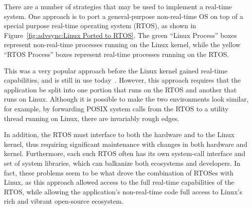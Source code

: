 There are a number of strategies that may be used to implement a
real-time system.
One approach is to port a general-purpose non-real-time OS on top
of a special purpose real-time operating system (RTOS), as shown in
Figure~\ref{fig:advsync:Linux Ported to RTOS}.
The green ``Linux Process'' boxes represent non-real-time processes
running on the Linux kernel, while the yellow ``RTOS Process''
boxes represent real-time processes running on the RTOS.

This was a very popular approach before the Linux kernel gained
real-time capabilities, and is still in use
today~\cite{Xenomai2014,VictorYodaiken2004a}.
However, this approach requires that the application be split into
one portion that runs on the RTOS and another that runs on Linux.
Although it is possible to make the two environments look similar,
for example, by forwarding POSIX system calls from the RTOS to a
utility thread running on Linux, there are invariably rough edges.

In addition, the RTOS must interface to both the hardware and to
the Linux kernel, thus requiring significant maintenance with
changes in both hardware and kernel.
Furthermore, each such RTOS often has its own system-call interface
and set of system libraries, which can balkanize both ecosystems and
developers.
In fact, these problems seem to be what drove the combination of
RTOSes with Linux, as this approach allowed access to the full real-time
capabilities of the RTOS, while allowing the application's non-real-time
code full access to Linux's rich and vibrant open-source ecosystem.

